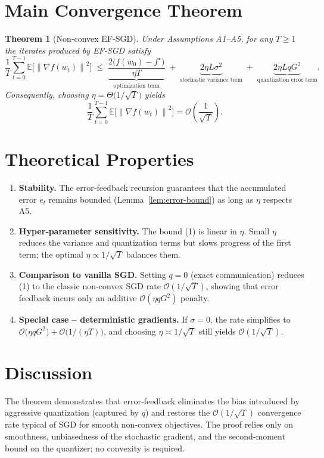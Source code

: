 \documentclass{article}
\newtheorem{theorem}{Theorem}
\newcommand{\E}{\mathbb{E}}
\newcommand{\norm}[1]{\left\|#1\right\|}
\begin{document}
\section*{Main Convergence Theorem}
\begin{theorem}[Non‑convex EF‑SGD]
\label{thm:efsgd}
Under Assumptions A1–A5, for any $T\ge1$ the iterates produced by EF‑SGD satisfy
\[
\frac{1}{T}\sum_{t=0}^{T-1}\E\bigl[\norm{\nabla f(w_{t})}^{2}\bigr]
\;\le\;
\underbrace{\frac{2\bigl(f(w_{0})-f^{\star}\bigr)}{\eta T}}_{\text{optimization term}}
\;+\;
\underbrace{2\eta L\sigma^{2}}_{\text{stochastic variance term}}
\;+\;
\underbrace{2\eta L q G^{2}}_{\text{quantization error term}} .
\tag{1}
\]
Consequently, choosing $\eta = \Theta\!\bigl(1/\sqrt{T}\bigr)$ yields
\[
\frac{1}{T}\sum_{t=0}^{T-1}\E\bigl[\norm{\nabla f(w_{t})}^{2}\bigr]=\mathcal{O}\!\left(\frac{1}{\sqrt{T}}\right).
\]
\end{theorem}

\section*{Theoretical Properties}
\begin{enumerate}[label=\textbf{P\arabic*},leftmargin=*]
\item \textbf{Stability.} The error‑feedback recursion guarantees that the accumulated error $e_{t}$ remains bounded (Lemma~\ref{lem:error-bound}) as long as $\eta$ respects A5.
\item \textbf{Hyper‑parameter sensitivity.} The bound (1) is linear in $\eta$. Small $\eta$ reduces the variance and quantization terms but slows progress of the first term; the optimal $\eta\propto 1/\sqrt{T}$ balances them.
\item \textbf{Comparison to vanilla SGD.} Setting $q=0$ (exact communication) reduces (1) to the classic non‑convex SGD rate $\mathcal{O}(1/\sqrt{T})$, showing that error feedback incurs only an additive $\mathcal{O}(\eta q G^{2})$ penalty.
\item \textbf{Special case – deterministic gradients.} If $\sigma=0$, the rate simplifies to $\mathcal{O}\!\bigl(\eta q G^{2}\bigr)+\mathcal{O}\!\bigl(1/(\eta T)\bigr)$, and choosing $\eta\asymp 1/\sqrt{T}$ still yields $\mathcal{O}(1/\sqrt{T})$.
\end{enumerate}

\section*{Discussion}
The theorem demonstrates that error‑feedback eliminates the bias introduced by aggressive quantization (captured by $q$) and restores the $\mathcal{O}(1/\sqrt{T})$ convergence rate typical of SGD for smooth non‑convex objectives. The proof relies only on smoothness, unbiasedness of the stochastic gradient, and the second‑moment bound on the quantizer; no convexity is required.
\end{document}
